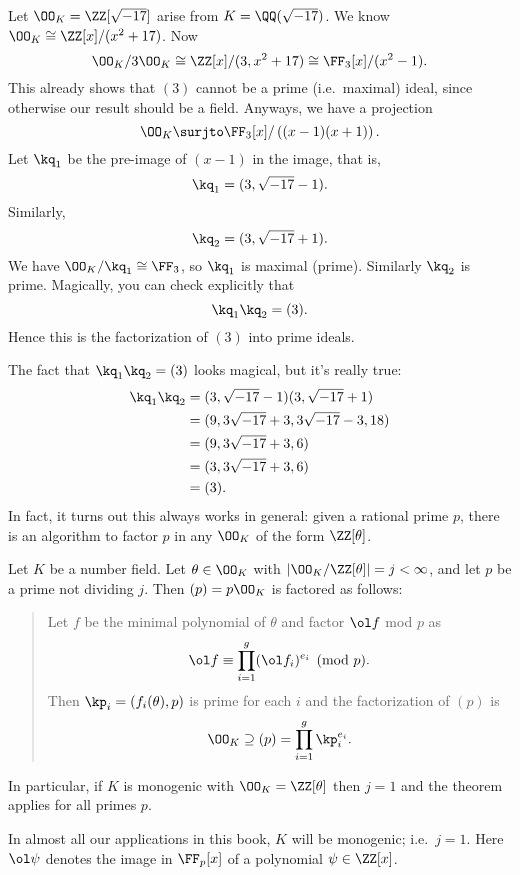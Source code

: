 \begin{example}
	Let $\OO_K = \ZZ[\sqrt{-17}]$ arise from $K = \QQ(\sqrt{-17})$.
	We know $\OO_K \cong \ZZ[x] / (x^2+17)$.
	Now
	\[
		\OO_K / 3\OO_K \cong \ZZ[x] / (3,x^2+17)
		\cong \FF_3[x] / (x^2-1).
	\]
	This already shows that $(3)$ cannot be a prime (i.e.\ maximal) ideal,
	since otherwise our result should be a field.
	Anyways, we have a projection
	\[ \OO_K \surjto \FF_3[x] / \left( (x-1)(x+1) \right). \]
	Let $\kq_1$ be the pre-image of $(x-1)$ in the image, that is,
	\[ \kq_1 = (3, \sqrt{-17}-1). \]
	Similarly, \[ \kq_2 = (3, \sqrt{-17}+1). \]
	We have $\OO_K / \kq_1 \cong \FF_3$, so $\kq_1$ is maximal (prime).
	Similarly $\kq_2$ is prime.
	Magically, you can check explicitly that
	\[ \kq_1 \kq_2 = (3). \]
	Hence this is the factorization of $(3)$ into prime ideals.
\end{example}

The fact that $\kq_1 \kq_2 = (3)$ looks magical, but it's really true:
\begin{align*}
	\kq_1\kq_2
	&= (3, \sqrt{-17}-1) (3, \sqrt{-17}+1) \\
	&= (9, 3\sqrt{-17}+3, 3\sqrt{-17}-3, 18) \\
	&= (9, 3\sqrt{-17}+3, 6) \\
	&= (3, 3\sqrt{-17}+3, 6) \\
	&= (3).
\end{align*}
In fact, it turns out this always works in general:
given a rational prime $p$, there is an algorithm
to factor $p$ in any $\OO_K$ of the form $\ZZ[\theta]$.

\begin{theorem}
	\label{thm:factor_alg}
	Let $K$ be a number field.
	Let $\theta \in \OO_K$ with $|\OO_K / \ZZ[\theta]| = j < \infty$,
	and let $p$ be a prime not dividing $j$.
	Then $(p) = p \OO_K$ is factored as follows:
	\begin{quote}
		Let $f$ be the minimal polynomial of $\theta$ and
		factor $\ol f$ mod $p$ as
		\[ \ol f \equiv \prod_{i=1}^g (\ol f_i)^{e_i} \pmod p. \]
		Then $\kp_i = (f_i(\theta), p)$ is prime for each $i$
		and the factorization of $(p)$ is
		\[ \OO_K \supseteq (p) = \prod_{i=1}^g \kp_i^{e_i}. \]
	\end{quote}
	In particular, if $K$ is monogenic with $\OO_K = \ZZ[\theta]$ then $j=1$
	and the theorem applies for all primes $p$.
\end{theorem}
In almost all our applications in this book, $K$ will be monogenic; i.e.\ $j=1$.
Here $\ol \psi$ denotes the image in $\FF_p[x]$ of a polynomial $\psi \in \ZZ[x]$.

